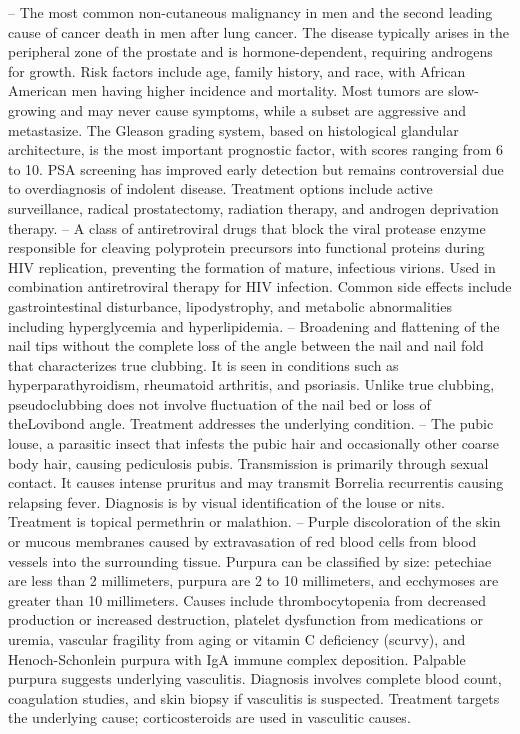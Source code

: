 -- The most common non-cutaneous malignancy in men and the second leading cause of cancer death in men after lung cancer. The disease typically arises in the peripheral zone of the prostate and is hormone-dependent, requiring androgens for growth. Risk factors include age, family history, and race, with African American men having higher incidence and mortality. Most tumors are slow-growing and may never cause symptoms, while a subset are aggressive and metastasize. The Gleason grading system, based on histological glandular architecture, is the most important prognostic factor, with scores ranging from 6 to 10. PSA screening has improved early detection but remains controversial due to overdiagnosis of indolent disease. Treatment options include active surveillance, radical prostatectomy, radiation therapy, and androgen deprivation therapy.
-- A class of antiretroviral drugs that block the viral protease enzyme responsible for cleaving polyprotein precursors into functional proteins during HIV replication, preventing the formation of mature, infectious virions. Used in combination antiretroviral therapy for HIV infection. Common side effects include gastrointestinal disturbance, lipodystrophy, and metabolic abnormalities including hyperglycemia and hyperlipidemia.
-- Broadening and flattening of the nail tips without the complete loss of the angle between the nail and nail fold that characterizes true clubbing. It is seen in conditions such as hyperparathyroidism, rheumatoid arthritis, and psoriasis. Unlike true clubbing, pseudoclubbing does not involve fluctuation of the nail bed or loss of theLovibond angle. Treatment addresses the underlying condition.
-- The pubic louse, a parasitic insect that infests the pubic hair and occasionally other coarse body hair, causing pediculosis pubis. Transmission is primarily through sexual contact. It causes intense pruritus and may transmit Borrelia recurrentis causing relapsing fever. Diagnosis is by visual identification of the louse or nits. Treatment is topical permethrin or malathion.
-- Purple discoloration of the skin or mucous membranes caused by extravasation of red blood cells from blood vessels into the surrounding tissue. Purpura can be classified by size: petechiae are less than 2 millimeters, purpura are 2 to 10 millimeters, and ecchymoses are greater than 10 millimeters. Causes include thrombocytopenia from decreased production or increased destruction, platelet dysfunction from medications or uremia, vascular fragility from aging or vitamin C deficiency (scurvy), and Henoch-Schonlein purpura with IgA immune complex deposition. Palpable purpura suggests underlying vasculitis. Diagnosis involves complete blood count, coagulation studies, and skin biopsy if vasculitis is suspected. Treatment targets the underlying cause; corticosteroids are used in vasculitic causes.
